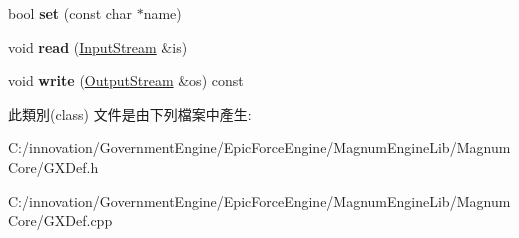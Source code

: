 \begin{DoxyCompactItemize}
\item 
bool {\bfseries set} (const char $\ast$name)\hypertarget{class_i_dream_sky_1_1_g_x_vertex_format_a35463852fa2d9071f6bf74b181f946da}{}\label{class_i_dream_sky_1_1_g_x_vertex_format_a35463852fa2d9071f6bf74b181f946da}

\item 
void {\bfseries read} (\hyperlink{class_i_dream_sky_1_1_input_stream}{Input\+Stream} \&is)\hypertarget{class_i_dream_sky_1_1_g_x_vertex_format_a369e1922b724d9c041716f799b201496}{}\label{class_i_dream_sky_1_1_g_x_vertex_format_a369e1922b724d9c041716f799b201496}

\item 
void {\bfseries write} (\hyperlink{class_i_dream_sky_1_1_output_stream}{Output\+Stream} \&os) const \hypertarget{class_i_dream_sky_1_1_g_x_vertex_format_af0e745a9144e4798b2556dbc29fec4af}{}\label{class_i_dream_sky_1_1_g_x_vertex_format_af0e745a9144e4798b2556dbc29fec4af}

\end{DoxyCompactItemize}


此類別(class) 文件是由下列檔案中產生\+:\begin{DoxyCompactItemize}
\item 
C\+:/innovation/\+Government\+Engine/\+Epic\+Force\+Engine/\+Magnum\+Engine\+Lib/\+Magnum\+Core/G\+X\+Def.\+h\item 
C\+:/innovation/\+Government\+Engine/\+Epic\+Force\+Engine/\+Magnum\+Engine\+Lib/\+Magnum\+Core/G\+X\+Def.\+cpp\end{DoxyCompactItemize}
